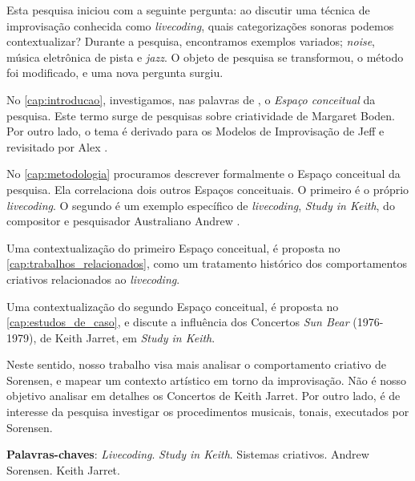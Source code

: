 \setlength{\absparsep}{18pt} %
\begin{resumo}
Esta pesquisa iniciou com a seguinte pergunta: ao discutir uma técnica de improvisação conhecida como \textit{livecoding}, quais categorizações sonoras podemos contextualizar? Durante a pesquisa, encontramos exemplos variados; \emph{noise}, música eletrônica de pista e \emph{jazz}. O objeto de pesquisa se transformou, o método foi modificado, e uma nova pergunta surgiu.

No \autoref{cap:introducao}, investigamos, nas palavras de , o \emph{Espaço conceitual} da pesquisa. Este termo surge de pesquisas sobre criatividade de Margaret Boden. Por outro lado, o tema é derivado para os Modelos de Improvisação de Jeff  e revisitado por Alex .

No \autoref{cap:metodologia} procuramos descrever formalmente o Espaço conceitual da pesquisa. Ela correlaciona dois outros Espaços conceituais. O primeiro é o próprio \emph{livecoding}. O segundo é um exemplo específico de \emph{livecoding}, \emph{Study in Keith}, do compositor e pesquisador Australiano Andrew .

Uma contextualização do primeiro Espaço conceitual, é proposta no \autoref{cap:trabalhos_relacionados}, como um tratamento histórico dos comportamentos criativos relacionados ao \emph{livecoding}.

Uma contextualização  do segundo Espaço conceitual, é proposta no \autoref{cap:estudos_de_caso}, e discute a influência dos Concertos \emph{Sun Bear} (1976-1979), de Keith Jarret, em \emph{Study in Keith}.

Neste sentido, nosso trabalho visa mais analisar o comportamento criativo de Sorensen, e mapear um contexto artístico em torno da improvisação. Não é nosso objetivo analisar em detalhes os Concertos de Keith Jarret. Por outro lado, é de interesse da pesquisa investigar os procedimentos musicais, tonais, executados por Sorensen.

\vspace{\onelineskip}
\noindent
\textbf{Palavras-chaves}: \textit{Livecoding}. \emph{Study in Keith}. Sistemas criativos. Andrew Sorensen. Keith Jarret.
\end{resumo}

